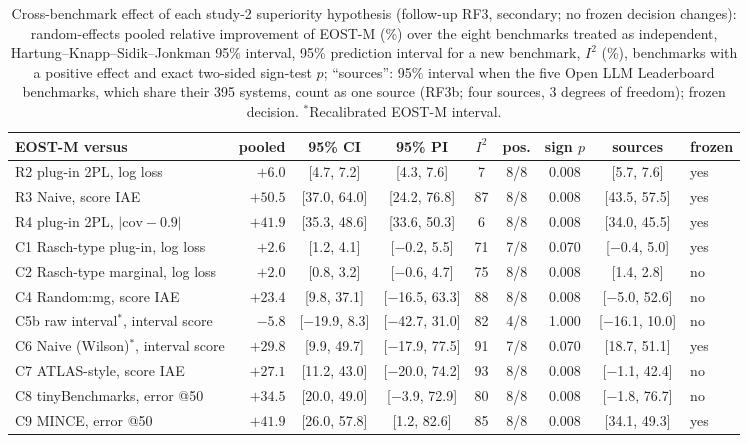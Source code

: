 \begin{table}[tbp]
\centering\footnotesize
\caption{Cross-benchmark effect of each study-2 superiority hypothesis (follow-up RF3, secondary; no frozen decision changes): random-effects pooled relative improvement of EOST-M (\%) over the eight benchmarks treated as independent, Hartung--Knapp--Sidik--Jonkman 95\% interval, 95\% prediction interval for a new benchmark, $I^2$ (\%), benchmarks with a positive effect and exact two-sided sign-test $p$; ``sources'': 95\% interval when the five Open LLM Leaderboard benchmarks, which share their 395 systems, count as one source (RF3b; four sources, 3 degrees of freedom); frozen decision. $^\ast$Recalibrated EOST-M interval.}
\label{tab:meta}
\setlength{\tabcolsep}{2.5pt}
\begin{tabular}{@{}lrccccccl@{}}
\toprule
EOST-M versus & pooled & 95\% CI & 95\% PI & $I^2$ & pos. & sign $p$ & sources & frozen \\
\midrule
R2 plug-in 2PL, log loss & $+6.0$ & [4.7, 7.2] & [4.3, 7.6] & 7 & 8/8 & 0.008 & [5.7, 7.6] & yes \\
R3 Naive, score IAE & $+50.5$ & [37.0, 64.0] & [24.2, 76.8] & 87 & 8/8 & 0.008 & [43.5, 57.5] & yes \\
R4 plug-in 2PL, $|\mathrm{cov}-0.9|$ & $+41.9$ & [35.3, 48.6] & [33.6, 50.3] & 6 & 8/8 & 0.008 & [34.0, 45.5] & yes \\
C1 Rasch-type plug-in, log loss & $+2.6$ & [1.2, 4.1] & [$-$0.2, 5.5] & 71 & 7/8 & 0.070 & [$-$0.4, 5.0] & yes \\
C2 Rasch-type marginal, log loss & $+2.0$ & [0.8, 3.2] & [$-$0.6, 4.7] & 75 & 8/8 & 0.008 & [1.4, 2.8] & no \\
C4 Random:mg, score IAE & $+23.4$ & [9.8, 37.1] & [$-$16.5, 63.3] & 88 & 8/8 & 0.008 & [$-$5.0, 52.6] & no \\
C5b raw interval$^\ast$, interval score & $-5.8$ & [$-$19.9, 8.3] & [$-$42.7, 31.0] & 82 & 4/8 & 1.000 & [$-$16.1, 10.0] & no \\
C6 Naive (Wilson)$^\ast$, interval score & $+29.8$ & [9.9, 49.7] & [$-$17.9, 77.5] & 91 & 7/8 & 0.070 & [18.7, 51.1] & yes \\
C7 ATLAS-style, score IAE & $+27.1$ & [11.2, 43.0] & [$-$20.0, 74.2] & 93 & 8/8 & 0.008 & [$-$1.1, 42.4] & no \\
C8 tinyBenchmarks, error @50 & $+34.5$ & [20.0, 49.0] & [$-$3.9, 72.9] & 80 & 8/8 & 0.008 & [$-$1.8, 76.7] & no \\
C9 MINCE, error @50 & $+41.9$ & [26.0, 57.8] & [1.2, 82.6] & 85 & 8/8 & 0.008 & [34.1, 49.3] & yes \\
\bottomrule
\end{tabular}
\end{table}
